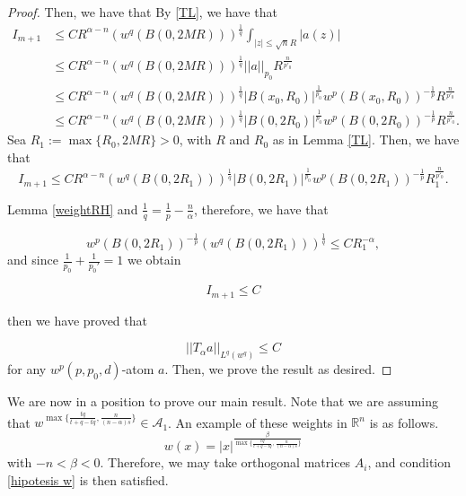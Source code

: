 \documentclass[a4paper,12pt,reqno]{amsart}
\numberwithin{equation}{section}
\begin{document}
\begin{proof}
		Then, we have that
		By \ref{TL}, we have that
		$$ \begin{aligned}
			I_{m+1}& \leq C   R^{\alpha-n}(w^{q}(B(0,2MR)))^{\frac 1q}\int _{|z|\leq\sqrt n R}|a(z)|\\
			&\leq C   R^{\alpha-n}(w^{q}(B(0,2MR)))^{\frac 1q} ||a||_{p_0} R^{\frac{n}{p'_0}}\\
			&\leq C  R^{\alpha-n}(w^{q}(B(0,2MR)))^{\frac 1q} |B(x_0,R_0)|^{\frac{1}{p_0}} w^{p}(B(x_0,R_0))^{-\frac{1}{p}} R^{\frac{n}{p'_0}}\\
			&\leq C  R^{\alpha-n}(w^{q}(B(0,2MR)))^{\frac 1q} |B(0,2R_0)|^{\frac{1}{p_0}} w^{p}(B(0,2R_0))^{-\frac{1}{p}} R^{\frac{n}{p'_0}}.
		\end{aligned}
		$$
		Sea $R_1:=\max\{R_0,2MR\} > 0$, with $R$ and $R_0$ as in Lemma \ref{TL}. Then, we have that
		\begin{equation*}
			I_{m+1} \leq C  R^{\alpha-n}(w^{q}(B(0,2R_1)))^{\frac 1q} |B(0,2R_1)|^{\frac{1}{p_0}} w^{p}(B(0,2R_1))^{-\frac{1}{p}} R_1^{\frac{n}{p'_0}}.
		\end{equation*}
		
		Lemma \ref{weightRH} and  $\frac{1}{q}=\frac{1}{p}-\frac{n}{\alpha}$, therefore, we have that
		
		$$w^p(B(0,2R_1))^{-\frac 1p}(w^{q}(B(0,2R_1)))^{\frac 1q} \leq CR_1^{-\alpha},
		$$
		and since $\frac{1}{p_0}+\frac{1}{p_0'}=1$ we obtain 
		
		$$I_{m+1}\leq C$$
		
		then we have proved that  
		
		$$
		||T_\alpha a||_{L^q(w^q)}\leq C
		$$
		for any $w^p(p,p_0, d)$-atom $a$. Then, we prove the result as desired.
		
	\end{proof}
	
	
	
	We are now in a position to prove our main result. Note that we are assuming that $w^{\max\{\frac{tq}{t+q-tq},\frac{n}{(n-\alpha)s}\}} \in \mathcal{A}_1$. An example of these weights in $\mathbb{R}^n$ is as follows.
	\begin{equation*}
		w(x)=|x|^{\frac{\beta}{\max\{\frac{tq}{t+q-tq},\frac{n}{(n-\alpha)s}\}}}
	\end{equation*}
	with $-n<\beta<0$.  Therefore, we may take orthogonal matrices $A_i$, and condition \eqref{hipotesis w} is then satisfied.
	
\end{document}
